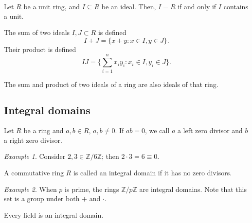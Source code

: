 \documentclass[11pt]{article}
\newcommand{\Z}{\mathbb{Z}}
\theoremstyle{definition}
\theoremstyle{remark}
\newtheorem*{example}{Example}
\numberwithin{equation}{section}
\begin{document}
    \begin{lemma}
        Let $R$ be a unit ring, and $I \subseteq R$ be an ideal. Then, $I = R$ if and
        only if $I$ contains a unit.
    \end{lemma}

    \begin{definition}
        The sum of two ideals $I, J \subset R$ is defined \[
            I + J = \{x + y: x \in I, y \in J\}.
        \] Their product is defined \[
            IJ = \{\sum_{i = 1}^n x_iy_i: x_i \in I, y_i \in J\}.
        \]
    \end{definition}

    \begin{lemma}
        The sum and product of two ideals of a ring are also ideals of that ring.
    \end{lemma}
    
    \subsection{Integral domains}
    
    \begin{definition}
        Let $R$ be a ring and $a, b \in R$, $a, b \neq 0$. If $ab = 0$, we call $a$ a
        left zero divisor and $b$ a right zero divisor.
    \end{definition}
    \begin{example}
        Consider $2, 3 \in \Z/6\Z$; then $2\cdot 3 = 6 \equiv 0$.
    \end{example}

    \begin{definition}
        A commutative ring $R$ is called an integral domain if it has no zero
        divisors.
    \end{definition}
    \begin{example}
        When $p$ is prime, the rings $\Z/p\Z$ are integral domains. Note that this
        set is a group under both $+$ and $\cdot$.
    \end{example}

    \begin{lemma}
        Every field is an integral domain.
    \end{lemma}
\end{document}
